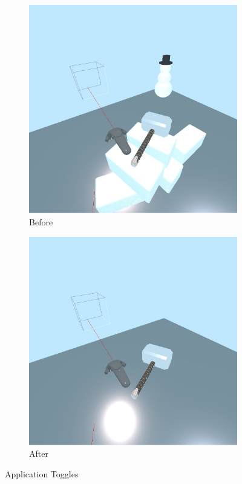 \documentclass[conference,12pt]{IEEEtran}
\begin{document}
\begin{figure}[H]
    \begin{subfigure}{\linewidth}
        \centering
        \includegraphics[width=0.8\linewidth]{screenshots/toggle_a.jpg}
        \caption{Before}
    \end{subfigure}
    \begin{subfigure}{\linewidth}
        \centering
        \includegraphics[width=0.8\linewidth]{screenshots/toggle_b.jpg}
        \caption{After}
    \end{subfigure}
    \caption{Application Toggles}\label{fig:toggles}
\end{figure}
\end{document}
